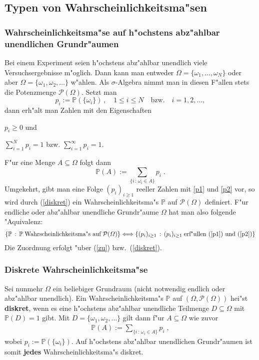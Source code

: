 \documentclass[ngerman,draft,parskip=half,twoside]{scrartcl}
\newcommand*{\PotM}{\mathcal{P}}    %
\newcommand*{\WKM}{\mathbb{P}}      %
\begin{document}
\subsection{Typen von Wahrscheinlichkeitsma"sen}
\subsubsection{Wahrscheinlichkeitsma"se auf h"ochstens abz"ahlbar unendlichen Grundr"aumen}
Bei einem Experiment seien h"ochstens abz"ahlbar unendlich viele Versuchsergebnisse
m"oglich. Dann kann man entweder $\Omega=\{\omega_1,\ldots,\omega_N\}$ oder
aber $\Omega=\{\omega_1,\omega_2,\ldots\}$ w"ahlen. Als $\sigma$-Algebra nimmt man in diesen
F"allen stets die Potenzmenge $\PotM(\Omega)$. Setzt man
\begin{equation}
\label{zu}
p_i :=\WKM(\{\omega_i\})\,,\quad 1\le i\le N\quad\mbox{bzw.}\quad i=1,2,\ldots,
\end{equation}
dann erh"alt man Zahlen mit den Eigenschaften
\begin{eigenschaften}
 \item $p_i\ge 0$ und
  \label{p1}
 \item $\sum_{i=1}^N p_i =1$ bzw. $\sum_{i=1}^\infty p_i =1$.
  \label{p2}
\end{eigenschaften}
F"ur eine Menge $A\subseteq \Omega$ folgt dann
\begin{equation}
\label{diskret}
\WKM(A):= \sum_{\{i\, : \,\omega_i\in A\}} p_i\;.
\end{equation}
Umgekehrt, gibt man eine Folge $(p_i)_{i\ge 1}$ reeller Zahlen mit \ref{p1} und \ref{p2} vor,
so wird durch (\ref{diskret}) ein Wahrscheinlichkeitsma"s $\WKM$ auf $\PotM(\Omega)$ definiert. F"ur
endliche oder abz"ahlbar unendliche Grundr"aume $\Omega$ hat man also folgende "Aquivalenz:
\begin{gather*}
  \{\WKM\,:\,\WKM\;\mbox{Wahrscheinlichkeitsma"s auf}\;\PotM(\Omega)\}
     \Longleftrightarrow\{(p_i)_{i\ge 1}\,:\, (p_i)_{i\ge 1}\;\mbox{erf"ullen (\ref{p1}) und (\ref{p2})}\}
\end{gather*}
Die Zuordnung erfolgt "uber (\ref{zu}) bzw.~(\ref{diskret}).

\subsubsection{Diskrete Wahrscheinlichkeitsma"se}
Sei nunmehr $\Omega$ ein beliebiger Grundraum (nicht notwendig endlich
oder abz"ahlbar unendlich). Ein Wahrscheinlichkeitsma"s $\WKM$ auf $(\Omega,\PotM(\Omega))$
hei"st \textbf{diskret}, wenn es eine h"ochstens abz"ahlbar unendliche Teilmenge $D\subseteq \Omega$
mit $\WKM(D)=1$ gibt. Mit $D=\{\omega_1,\omega_2,\ldots\}$ gilt dann f"ur $A\subseteq \Omega$ wie zuvor
\begin{gather*}
  \WKM(A):= \sum_{\{i\, : \,\omega_i\in A\}} p_i\;,
\end{gather*}
wobei $p_i:=\WKM(\{\omega_i\})$. Auf h"ochstens abz"ahlbar unendlichen Grundr"aumen ist somit \textbf{jedes}
Wahrscheinlichkeitsma"s diskret.
\end{document}
